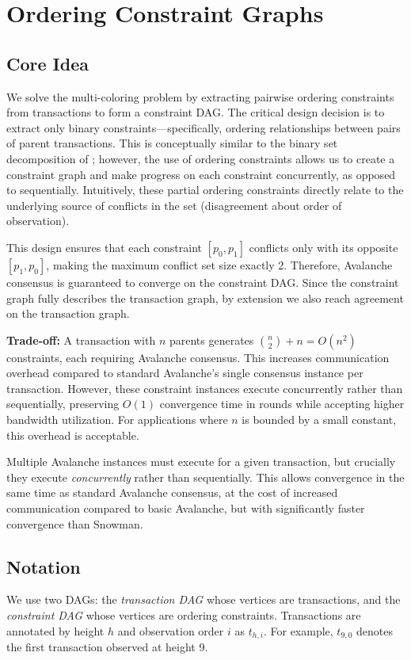\documentclass[12pt]{article}
\begin{document}
\section{Ordering Constraint Graphs}
\subsection{Core Idea}
We solve the multi-coloring problem by extracting pairwise ordering constraints
from transactions to form a constraint DAG. The critical design decision is to
extract only binary constraints—specifically, ordering relationships between
pairs of parent transactions. This is conceptually similar to the binary set
decomposition of \cite{buchwald2024frosty}; however, the use of ordering
constraints allows us to create a constraint graph and make progress on each
constraint concurrently, as opposed to sequentially. Intuitively, these partial
ordering constraints directly relate to the underlying source of conflicts in
the set (disagreement about order of observation).

This design ensures that each constraint $[p_0, p_1]$ conflicts only with its
opposite $[p_1, p_0]$, making the maximum conflict set size exactly 2.
Therefore, Avalanche consensus is guaranteed to converge on the constraint DAG.
Since the constraint graph fully describes the transaction graph, by extension
we also reach agreement on the transaction graph.

\textbf{Trade-off:} A transaction with $n$ parents generates $\binom{n}{2} + n
= O(n^2)$ constraints, each requiring Avalanche consensus. This increases
communication overhead compared to standard Avalanche's single consensus
instance per transaction. However, these constraint instances execute
concurrently rather than sequentially, preserving $O(1)$ convergence time in
rounds while accepting higher bandwidth utilization. For applications where $n$
is bounded by a small constant, this overhead is acceptable.

Multiple Avalanche instances must execute for a given transaction, but
crucially they execute \emph{concurrently} rather than sequentially. This
allows convergence in the same time as standard Avalanche consensus, at the
cost of increased communication compared to basic Avalanche, but with
significantly faster convergence than Snowman.

\subsection{Notation}
We use two DAGs: the \emph{transaction DAG} whose vertices are transactions,
and the \emph{constraint DAG} whose vertices are ordering constraints.
Transactions are annotated by height $h$ and observation order $i$ as
$t_{h,i}$. For example, $t_{9,0}$ denotes the first transaction observed at
height 9.
\end{document}
